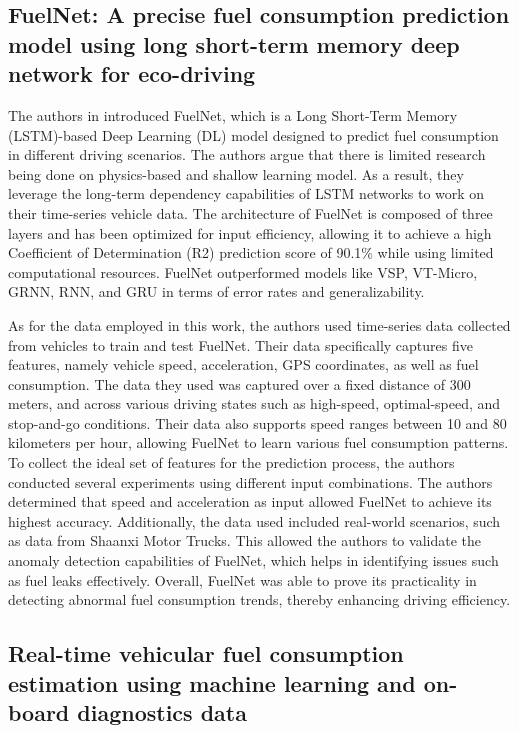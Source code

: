 \documentclass[letterpaper]{article}
\begin{document}
\subsection*{FuelNet: A precise fuel consumption prediction model using long
short-term memory deep network for eco-driving}

The authors in \cite{wang2020fuelnet} introduced FuelNet, which is a Long
Short-Term Memory (LSTM)-based Deep Learning (DL) model designed to predict fuel
consumption in different driving scenarios. The authors argue that there is
limited research being done on physics-based and shallow learning model. As a
result, they leverage the long-term dependency capabilities of LSTM networks to
work on their time-series vehicle data. The architecture of FuelNet is composed
of three layers and has been optimized for input efficiency, allowing it to
achieve a high Coefficient of Determination (R2) prediction score of 90.1\% while
using limited computational resources. FuelNet outperformed models like VSP,
VT-Micro, GRNN, RNN, and GRU in terms of error rates and generalizability. 

As for the data employed in this work, the authors used time-series data collected
from vehicles to train and test FuelNet. Their data specifically captures five
features, namely vehicle speed, acceleration, GPS coordinates, as well as fuel
consumption. The data they used was captured over a fixed distance of 300 meters,
and across various driving states such as high-speed, optimal-speed, and
stop-and-go conditions. Their data also supports speed ranges between 10 and 80
kilometers per hour, allowing FuelNet to learn various fuel consumption patterns.
To collect the ideal set of features for the prediction process, the authors
conducted several experiments using different input combinations. The authors
determined that speed and acceleration as input allowed FuelNet to achieve its
highest accuracy. Additionally, the data used included real-world scenarios,
such as data from Shaanxi Motor Trucks. This allowed the authors to validate the
anomaly detection capabilities of FuelNet, which helps in identifying issues
such as fuel leaks effectively. Overall, FuelNet was able to prove its
practicality in detecting abnormal fuel consumption trends, thereby enhancing
driving efficiency.

\subsection*{Real-time vehicular fuel consumption estimation using machine
learning and on-board diagnostics data}
\end{document}
